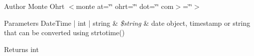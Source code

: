 \begin{DoxyAuthor}{Author}
Monte Ohrt $<$monte at=\char`\"{}\char`\"{} ohrt=\char`\"{}\char`\"{} dot=\char`\"{}\char`\"{} com$>$=\char`\"{}\char`\"{}$>$ 
\end{DoxyAuthor}

\begin{DoxyParams}[1]{Parameters}
Date\+Time | int | string & {\em \$string} & date object, timestamp or string that can be converted using strtotime() \\
\hline
\end{DoxyParams}
\begin{DoxyReturn}{Returns}
int 
\end{DoxyReturn}
